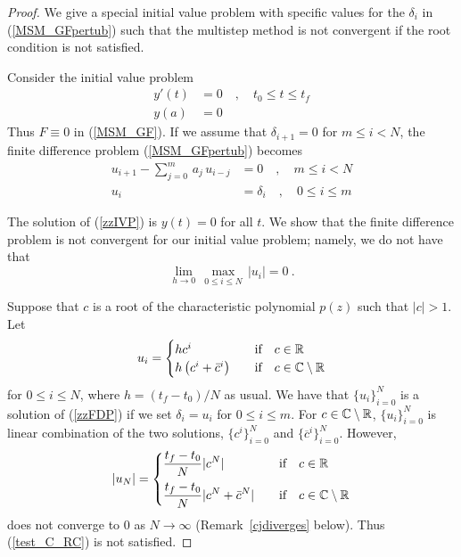 \begin{proof}
We give a special initial value problem with specific values for the
$\delta_i$ in (\ref{MSM_GFpertub}) such that the multistep method is
not convergent if the root condition is not satisfied.

Consider the initial value problem
\begin{equation} \label{zzIVP}
\begin{split}
y'(t) &= 0 \quad , \quad  t_0 \leq t \leq t_f\\
y(a) &= 0
\end{split}
\end{equation}
Thus $F \equiv 0$ in (\ref{MSM_GF}).
If we assume that $\delta_{i+1} = 0$ for $m \leq i < N$, the
finite difference problem (\ref{MSM_GFpertub}) becomes 
\begin{equation} \label{zzFDP}
\begin{split}
u_{i+1} - \sum_{j=0}^m\,a_j\,u_{i-j} &= 0 \quad, \quad m \leq i < N \\
u_i &= \delta_i \quad, \quad 0 \leq i \leq m
\end{split}
\end{equation}

The solution of (\ref{zzIVP}) is $y(t) = 0$ for all $t$.  We show that
the finite difference problem is not convergent for our initial value
problem; namely, we do not have that
\begin{equation} \label{test_C_RC}
\lim_{h \rightarrow 0}\,\max_{0\leq i \leq N} \, | u_i | = 0 \ .
\end{equation}

Suppose that $c$ is a root of the characteristic polynomial $p(z)$
such that $|c|>1$.  Let
\[
u_i = \begin{cases}
h c^i & \quad \text{if}\quad c \in \mathbb{R} \\
h \left( c^i + \bar{c}^i \right) & \quad \text{if}\quad c \in \mathbb{C} \setminus \mathbb{R}
\end{cases}
\]
for $0\leq i \leq N$, where $h = (t_f-t_0)/N$ as usual.
We have that $\displaystyle \{u_i\}_{i=0}^N$ is a solution of
(\ref{zzFDP}) if we set $\delta_i = u_i$ for $0\leq i \leq m$.
For $c \in \mathbb{C} \setminus \mathbb{R}$,
$\displaystyle \{u_i\}_{i=0}^N$ is linear combination of the two solutions,
$\displaystyle \{c^i\}_{i=0}^N$ and
$\displaystyle \{\overline{c}^i\}_{i=0}^N$.
However,
\[
|u_N| =
\begin{cases}
\displaystyle
\frac{t_f-t_0}{N} |c^N| & \quad \text{if} \quad c \in \mathbb{R} \\[0.8em]
\displaystyle \frac{t_f-t_0}{N} |c^N + \bar{c}^N| &
\quad \text{if} \quad c \in \mathbb{C} \setminus \mathbb{R}
\end{cases}
\]
does not converge to $0$ as $N \to \infty$ (Remark~\ref{cjdiverges} below).
Thus (\ref{test_C_RC}) is not satisfied.


\end{proof}
